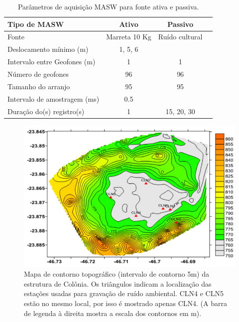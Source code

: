 \documentclass[smallextended]{svjour3}       %
\begin{document}
\begin{table}[!hbtp]
\caption{Parâmetros de aquisição MASW para fonte ativa e passiva.}
\label{table_parameters}
\centering
\begin{tabular}{@{}lccc@{}}
\toprule
Tipo de MASW         & Ativo & Passivo &  \\ \midrule
Fonte & Marreta 10 Kg         & Ruído cultural                    \\
Deslocamento mínimo (m)   & 1, 5, 6       &                         \\
Intervalo entre Geofones (m)      & 1             & 1                             \\
Número de geofones             & 96              & 96                                    \\ 
Tamanho do arranjo               & 95              & 95                                   \\ 
Intervalo de amostragem (ms)              & 0.5              &                                      \\ 
Duração do(s) registro(s)              & 1              & 15, 20, 30                                  \\ \bottomrule
\end{tabular}
\end{table}

\begin{figure}[!hbtp]
  \begin{center}
  
  \includegraphics[scale=0.7]{Figures/fig3.png}
  \end{center}
  \caption{Mapa de contorno topográfico (intervalo de contorno 5m) da estrutura de Colônia. Os triângulos indicam a localização das estações usadas para gravação de ruído ambiental. CLN4 e CLN5 estão no mesmo local, por isso é mostrado apenas CLN4. (A barra de legenda à direita mostra a escala dos contornos em m).}
  \label{stations}
\end{figure}
\end{document}
